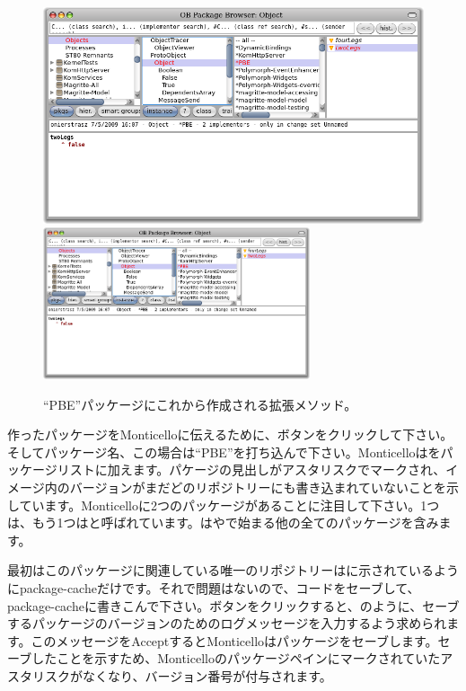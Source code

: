 \documentclass[a4paper,10pt,twoside]{book}
\begin{document}
\begin{figure}[btp]
	\begin{center}
	\ifluluelse
		{\includegraphics[width=\textwidth]{MCnewmethod}}
		{\includegraphics[width=0.7\textwidth]{MCnewmethod}}
	\end{center}
	\caption{``PBE''パッケージにこれから作成される拡張メソッド。}
\end{figure}

作ったパッケージをMonticelloに伝えるために、ボタンをクリックして下さい。そしてパッケージ名、この場合は``PBE''を打ち込んで下さい。Monticelloはをパッケージリストに加えます。パケージの見出しがアスタリスクでマークされ、イメージ内のバージョンがまだどのリポジトリーにも書き込まれていないことを示しています。Monticelloに2つのパッケージがあることに注目して下さい。1つは、もう1つはと呼ばれています。はやで始まる他の全てのパッケージを含みます。

最初はこのパッケージに関連している唯一のリポジトリーはに示されているようにpackage-cacheだけです。それで問題はないので、コードをセーブして、package-cacheに書きこんで下さい。ボタンをクリックすると、のように、セーブするパッケージのバージョンのためのログメッセージを入力するよう求められます。このメッセージをAcceptするとMonticelloはパッケージをセーブします。セーブしたことを示すため、Monticelloのパッケージペインにマークされていたアスタリスクがなくなり、バージョン番号が付与されます。
\end{document}

